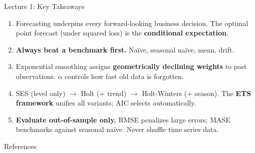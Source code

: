 \documentclass[aspectratio=169, 11pt]{beamer}
\begin{document}
\begin{frame}{Lecture 1: Key Takeaways}
  \begin{keybox}
    {\small
    \begin{enumerate}
      \item Forecasting underpins every forward-looking business decision.
            The optimal point forecast (under squared loss) is the
            \textbf{conditional expectation}.

      \item \textbf{Always beat a benchmark first.}
            Na\"{i}ve, seasonal na\"{i}ve, mean, drift.

      \item Exponential smoothing assigns \textbf{geometrically declining weights}
            to past observations. $\alpha$ controls how fast old data is forgotten.

      \item SES (level only) $\to$ Holt (+ trend) $\to$ Holt-Winters (+ season).
            The \textbf{ETS framework} unifies all variants; AIC selects automatically.

      \item \textbf{Evaluate out-of-sample only.}
            RMSE penalizes large errors; MASE benchmarks against seasonal na\"{i}ve.
            Never shuffle time series data.
    \end{enumerate}
    }
  \end{keybox}
\end{frame}

\begin{frame}[allowframebreaks]{References}
  \printbibliography[heading=none]
\end{frame}

\end{document}
